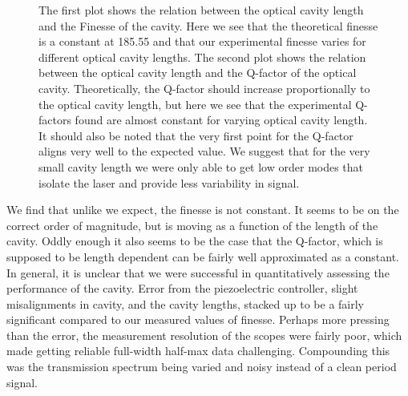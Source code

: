 \documentclass[11pt]{article}
\begin{document}
\begin{center}
	\begin{figure}[H]
	\centering
	\caption{The first plot shows the relation between the optical cavity length and the Finesse of the cavity. Here we see that the theoretical finesse is a constant at 185.55 and that our experimental finesse varies for different optical cavity lengths.
The second plot shows the relation between the optical cavity length and the Q-factor of the optical cavity.  Theoretically, the Q-factor should increase proportionally to the optical cavity length, but here we see that the experimental Q-factors found are almost constant for varying optical cavity length. It should also be noted that the very first point for the Q-factor aligns very well to the expected value. We suggest that for the very small cavity length we were only able to get low order modes that isolate the laser and provide less variability in signal.}
	\end{figure}
\end{center}
\vspace{-6mm} 


We find that unlike we expect, the finesse is not constant. It seems to be on the correct order of magnitude, but is moving as a function of the length of the cavity. Oddly enough it also seems to be the case that the Q-factor, which is supposed to be length dependent can be fairly well approximated as a constant. In general, it is unclear that we were successful in quantitatively assessing the performance of the cavity. Error from the piezoelectric controller, slight misalignments in cavity, and the cavity lengths, stacked up to be a fairly significant compared to our measured values of finesse. Perhaps more pressing than the error, the measurement resolution of the scopes were fairly poor, which made getting reliable full-width half-max data challenging. Compounding this was the  transmission spectrum being varied and noisy instead of a clean period signal. 
\end{document}
